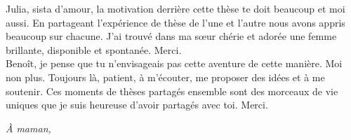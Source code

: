 Julia, sista 
d'amour, la motivation derrière cette thèse te doit beaucoup et moi aussi. En 
partageant l'expérience de thèse de l'une et l'autre nous avons appris beaucoup 
sur chacune. J'ai trouvé dans ma sœur chérie et adorée une femme brillante, 
disponible et spontanée. Merci.
\\

Benoît, je pense que tu n'envisageais pas cette aventure de cette manière. Moi 
non plus. Toujours là, 
patient, à m'écouter, me proposer des idées et à me soutenir. Ces 
moments de thèses partagés ensemble sont des morceaux de vie uniques que je 
suis heureuse d'avoir partagés avec toi. Merci.

\clearpage
\pagebreak

\thispagestyle{empty}
\begin{flushright}
\textit{À maman,}
\end{flushright}

\pagebreak
